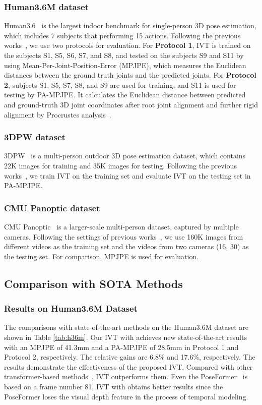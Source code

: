 \documentclass[sigconf]{acmart}
\begin{document}
\subsubsection{Human3.6M dataset}
Human3.6~\cite{ionescu2013human3} is the largest indoor benchmark for single-person 3D pose estimation, which includes 7 subjects that performing 15 actions. Following the previous works~\cite{zeng2020srnet,moon2019camera,zheng20213d,lin2021end}, we use two protocols for evaluation. 
For \textbf{Protocol 1}, IVT is trained on the subjects S1, S5, S6, S7, and S8, and tested on the subjects S9 and S11 by using Mean-Per-Joint-Position-Error (MPJPE), which measures the Euclidean distances between the ground truth joints and the predicted joints. 
For \textbf{Protocol 2}, subjects S1, S5, S7, S8, and S9 are used for training, and S11 is used for testing by PA-MPJPE. It calculates the Euclidean distance between predicted and ground-truth 3D joint coordinates after root joint alignment and further rigid alignment by Procrustes analysis~\cite{gower1975generalized}.

\subsubsection{3DPW dataset} 
3DPW~\cite{von2018recovering} is a multi-person outdoor 3D pose estimation dataset, which contains 22K images for training and 35K images for testing. Following the previous works~\cite{kocabas2020vibe,lin2021end,choi2021beyond}, we train IVT on the training set and evaluate IVT on the testing set in PA-MPJPE.

\subsubsection{CMU Panoptic dataset}
CMU Panoptic~\cite{joo2017panoptic} is a larger-scale multi-person dataset, captured by multiple cameras. Following the settings of previous works~\cite{wang2020hmor,zhen2020smap}, we use 160K images from different videos as the training set and the videos from two cameras (16, 30) as the testing set. For comparison, MPJPE is used for evaluation. 

\subsection{Comparison with SOTA Methods}

\subsubsection{Results on Human3.6M Dataset}
The comparisons with state-of-the-art methods on the Human3.6M dataset are shown in Table \ref{tab:h36m}. Our IVT with  achieves new state-of-the-art results with an MPJPE of 41.3mm and a PA-MPJPE of 28.5mm in Protocol 1 and Protocol 2, respectively. The relative gains are 6.8\% and 17.6\%, respectively. The results demonstrate the effectiveness of the proposed IVT. 
Compared with other transformer-based methods~\cite{lin2021end,zheng20213d,liu2021graph}, IVT outperforms them. Even the PoseFormer~\cite{zheng20213d} is based on a frame number 81, IVT with  obtains better results since the PoseFormer loses the visual depth feature in the process of temporal modeling.
\end{document}

